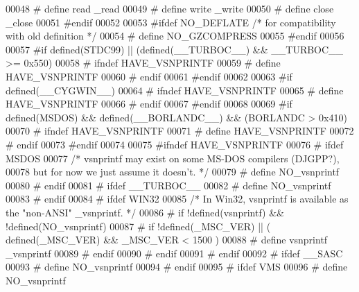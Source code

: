 \begin{DoxyCode}
00048 \textcolor{preprocessor}{#  define read \_read}
00049 \textcolor{preprocessor}{#  define write \_write}
00050 \textcolor{preprocessor}{#  define close \_close}
00051 \textcolor{preprocessor}{#endif}
00052 
00053 \textcolor{preprocessor}{#ifdef NO\_DEFLATE       }\textcolor{comment}{/* for compatibility with old definition */}\textcolor{preprocessor}{}
00054 \textcolor{preprocessor}{#  define NO\_GZCOMPRESS}
00055 \textcolor{preprocessor}{#endif}
00056 
00057 \textcolor{preprocessor}{#if defined(STDC99) || (defined(\_\_TURBOC\_\_) && \_\_TURBOC\_\_ >= 0x550)}
00058 \textcolor{preprocessor}{#  ifndef HAVE\_VSNPRINTF}
00059 \textcolor{preprocessor}{#    define HAVE\_VSNPRINTF}
00060 \textcolor{preprocessor}{#  endif}
00061 \textcolor{preprocessor}{#endif}
00062 
00063 \textcolor{preprocessor}{#if defined(\_\_CYGWIN\_\_)}
00064 \textcolor{preprocessor}{#  ifndef HAVE\_VSNPRINTF}
00065 \textcolor{preprocessor}{#    define HAVE\_VSNPRINTF}
00066 \textcolor{preprocessor}{#  endif}
00067 \textcolor{preprocessor}{#endif}
00068 
00069 \textcolor{preprocessor}{#if defined(MSDOS) && defined(\_\_BORLANDC\_\_) && (BORLANDC > 0x410)}
00070 \textcolor{preprocessor}{#  ifndef HAVE\_VSNPRINTF}
00071 \textcolor{preprocessor}{#    define HAVE\_VSNPRINTF}
00072 \textcolor{preprocessor}{#  endif}
00073 \textcolor{preprocessor}{#endif}
00074 
00075 \textcolor{preprocessor}{#ifndef HAVE\_VSNPRINTF}
00076 \textcolor{preprocessor}{#  ifdef MSDOS}
00077 \textcolor{comment}{/* vsnprintf may exist on some MS-DOS compilers (DJGPP?),}
00078 \textcolor{comment}{   but for now we just assume it doesn't. */}
00079 \textcolor{preprocessor}{#    define NO\_vsnprintf}
00080 \textcolor{preprocessor}{#  endif}
00081 \textcolor{preprocessor}{#  ifdef \_\_TURBOC\_\_}
00082 \textcolor{preprocessor}{#    define NO\_vsnprintf}
00083 \textcolor{preprocessor}{#  endif}
00084 \textcolor{preprocessor}{#  ifdef WIN32}
00085 \textcolor{comment}{/* In Win32, vsnprintf is available as the "non-ANSI" \_vsnprintf. */}
00086 \textcolor{preprocessor}{#    if !defined(vsnprintf) && !defined(NO\_vsnprintf)}
00087 \textcolor{preprocessor}{#      if !defined(\_MSC\_VER) || ( defined(\_MSC\_VER) && \_MSC\_VER < 1500 )}
00088 \textcolor{preprocessor}{#         define vsnprintf \_vsnprintf}
00089 \textcolor{preprocessor}{#      endif}
00090 \textcolor{preprocessor}{#    endif}
00091 \textcolor{preprocessor}{#  endif}
00092 \textcolor{preprocessor}{#  ifdef \_\_SASC}
00093 \textcolor{preprocessor}{#    define NO\_vsnprintf}
00094 \textcolor{preprocessor}{#  endif}
00095 \textcolor{preprocessor}{#  ifdef VMS}
00096 \textcolor{preprocessor}{#    define NO\_vsnprintf}

\end{DoxyCode}
